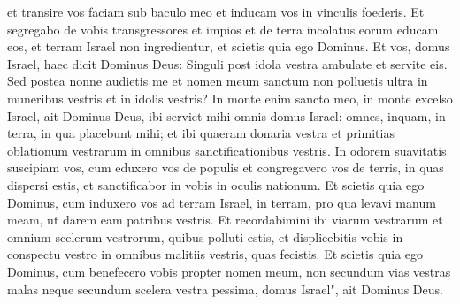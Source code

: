 \begin{biblechapter}
\verse et transire vos faciam sub baculo meo et inducam vos in vinculis foederis. 
\verse Et segregabo de vobis transgressores et impios et de terra incolatus eorum educam eos, et terram Israel non ingredientur, et scietis quia ego Dominus. 
\verse Et vos, domus Israel, haec dicit Dominus Deus: Singuli post idola vestra ambulate et servite eis. Sed postea nonne audietis me et nomen meum sanctum non polluetis ultra in muneribus vestris et in idolis vestris? 
\verse In monte enim sancto meo, in monte excelso Israel, ait Dominus Deus, ibi serviet mihi omnis domus Israel: omnes, inquam, in terra, in qua placebunt mihi; et ibi quaeram donaria vestra et primitias oblationum vestrarum in omnibus sanctificationibus vestris. 
\verse In odorem suavitatis suscipiam vos, cum eduxero vos de populis et congregavero vos de terris, in quas dispersi estis, et sanctificabor in vobis in oculis nationum. 
\verse Et scietis quia ego Dominus, cum induxero vos ad terram Israel, in terram, pro qua levavi manum meam, ut darem eam patribus vestris. 
\verse Et recordabimini ibi viarum vestrarum et omnium scelerum vestrorum, quibus polluti estis, et displicebitis vobis in conspectu vestro in omnibus malitiis vestris, quas fecistis. 
\verse Et scietis quia ego Dominus, cum benefecero vobis propter nomen meum, non secundum vias vestras malas neque secundum scelera vestra pessima, domus Israel", ait Dominus Deus. 
\end{biblechapter}

